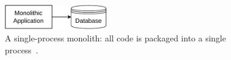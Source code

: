 \begin{figure}[!htbp]
    \centering
    \includegraphics[width=0.40\textwidth]{img/diagrams/pdf/single-process-monolith.drawio.pdf}
    \caption[Single-Process Monolith]{A single-process monolith: all code is packaged into a single process~\Parencite{newman2019monolith}.}
    \label{fig:single-process-monolith}
\end{figure}
